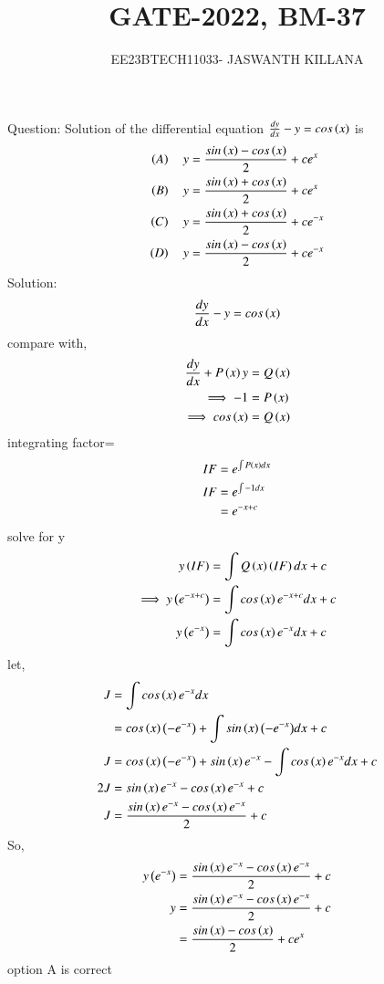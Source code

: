 \documentclass[journal,12pt,twocolumn]{IEEEtran}
\theoremstyle{remark}
\begin{document}

\vspace{3cm}

\title{GATE-2022, BM-37}
\author{EE23BTECH11033- JASWANTH KILLANA}
\maketitle
\newpage
\bigskip

\renewcommand{\thefigure}{\theenumi}
\renewcommand{\thetable}{\theenumi}
Question: Solution of the differential equation $\frac{dy}{dx}-y=cos\left(x\right)$ is
\begin{align}
\left(A\right)\quad y&=\frac{sin\left(x\right)-cos\left(x\right)}{2}+ce^x\\
\left(B\right)\quad y&=\frac{sin\left(x\right)+cos\left(x\right)}{2}+ce^x\\
\left(C\right)\quad y&=\frac{sin\left(x\right)+cos\left(x\right)}{2}+ce^{-x}\\
\left(D\right)\quad y&=\frac{sin\left(x\right)-cos\left(x\right)}{2}+ce^{-x}
\end{align}
Solution: \begin{align}\frac{dy}{dx}-y=cos\left(x\right)
\end{align}
compare with,
\begin{align}
\frac{dy}{dx}+P\left(x\right)y&=Q\left(x\right)\\
\implies -1&=P\left(x\right)\\
\implies cos\left(x\right)&=Q\left(x\right)
\end{align}
integrating factor=
\begin{align}
IF&=e^{\int P\left(x\right)dx}\\
IF&=e^{\int -1dx}\\
&=e^{-x+c}
\end{align}
solve for y
\begin{align}
y\left(IF\right)&=\int {Q\ensuremath{\left(x\right)}\ensuremath{\left(IF\right)}dx}+c\\
\implies y\left(e^{-x+c}\right)&=\int {cos\ensuremath{\left(x\right)}e^{-x+c}dx}+c\\
y\left(e^{-x}\right)&=\int {cos\ensuremath{\left(x\right)}e^{-x}dx}+c
\end{align}
let,
\begin{align}
J&=\int {cos\ensuremath{\left(x\right)}e^{-x}dx}\\
&=cos\left(x\right)\left(-e^{-x}\right)+\int {sin\ensuremath{\left(x\right)}\ensuremath{\left(-e^{-x}\right)}}dx+c\\
J&=cos\left(x\right)\left(-e^{-x}\right)+sin\left(x\right) e^{-x}-\int{cos\ensuremath{\left(x\right)}e^{-x}dx}+c\\
 2J&=sin\left(x\right) e^{-x}-cos\left(x\right)e^{-x}+c\\
 J&=\frac{sin\left(x\right) e^{-x}-cos\left(x\right)e^{-x}}{2}+c
\end{align}
So,
\begin{align}
y\left(e^{-x}\right)&=\frac{sin\left(x\right) e^{-x}-cos\left(x\right)e^{-x}}{2}+c\\
y&=\frac{sin\left(x\right) e^{-x}-cos\left(x\right)e^{-x}}{2}+c\\
&=\frac{sin\left(x\right)-cos\left(x\right)}{2}+ce^{x}
\end{align}
option A is correct
\end{document}
